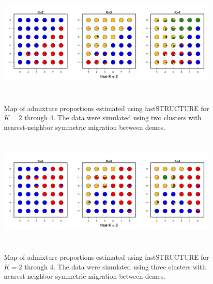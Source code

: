 \documentclass[12pt]{article}
\begin{document}
\begin{figure}
	\centering
		{\includegraphics[width=6in,height=2.25in]{figs/fastStr/fastStr_simK2_pies.pdf}}
	\caption{
	Map of admixture proportions estimated using fastSTRUCTURE \citep{fastStructure} for $K=2$ through 4.
	The data were simulated using two clusters with nearest-neighbor symmetric migration between demes.
    }\label{fastStr_simK2}
\end{figure}

\begin{figure}
	\centering
		{\includegraphics[width=6in,height=2.25in]{figs/fastStr/fastStr_simK3_pies.pdf}}
	\caption{
	Map of admixture proportions estimated using fastSTRUCTURE \citep{fastStructure} for $K=2$ through 4.
	The data were simulated using three clusters with nearest-neighbor symmetric migration between demes.
    }\label{fastStr_simK3}
\end{figure}
\end{document}
